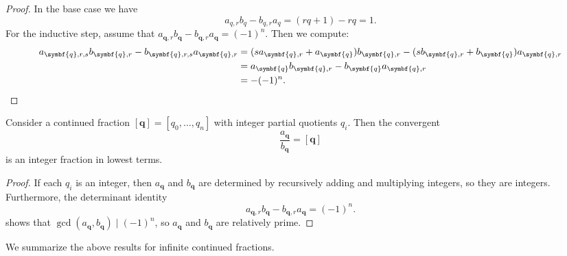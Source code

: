 \begin{proof}
  In the base case we have
  \begin{equation*}
    a_{q,r}b_q-b_{q,r}a_q=(rq+1)-rq=1.
  \end{equation*}
  For the inductive step, assume that $a_{\symbf{q},r}b_{\symbf{q}}-b_{\symbf{q},r}a_{\symbf{q}}=(-1)^n$. Then we compute:
  \begin{align*}
    a_{\symbf{q},r,s}b_{\symbf{q},r}-b_{\symbf{q},r,s}a_{\symbf{q},r} & = (sa_{\symbf{q},r}+a_{\symbf{q}})b_{\symbf{q},r}-(sb_{\symbf{q},r}+b_{\symbf{q}})a_{\symbf{q},r} \\
                                                                          & = a_{\symbf{q}}b_{\symbf{q},r}-b_{\symbf{q}}a_{\symbf{q},r} \\
    & = -(-1)^n.\qedhere
  \end{align*}
\end{proof}

\begin{theorem}\label{theorem:lowest-terms-convergents}
  Consider a continued fraction $[\symbf{q}]=[q_0,\ldots,q_n]$ with integer partial quotients $q_i$. Then the convergent
  \begin{equation*}
    \frac{a_{\symbf{q}}}{b_{\symbf{q}}}=[\symbf{q}]
  \end{equation*}
  is an integer fraction in lowest terms.
\end{theorem}

\begin{proof}
  If each $q_i$ is an integer, then $a_{\symbf{q}}$ and $b_{\symbf{q}}$ are determined by recursively adding and multiplying integers, so they are integers. Furthermore, the determinant identity
  \begin{equation*}
    a_{\symbf{q},r}b_{\symbf{q}}-b_{\symbf{q},r}a_{\symbf{q}}=(-1)^n.
  \end{equation*}
  shows that $\gcd(a_{\symbf{q}},b_{\symbf{q}})\mid (-1)^n$, so $a_{\symbf{q}}$ and $b_{\symbf{q}}$ are relatively prime.
\end{proof}

We summarize the above results for infinite continued fractions.

